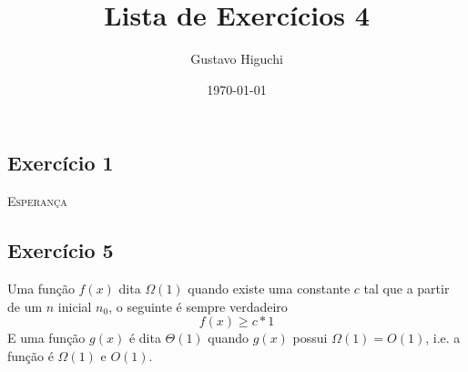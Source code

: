 \documentclass{article}
\title{Lista de Exercícios 4}
\author{Gustavo Higuchi}
\date{\today}
\begin{document}
\maketitle

\tableofcontents
\newpage


\chapter{}
\section{Exercício 1}
 \begin{algorithm}[H]
   \SetAlgoLined
   \label{alg1}
   \caption{\textsc{Esperança}}
 \end{algorithm}
\section{Exercício 5}
Uma função $f(x)$ dita $\Omega(1)$ quando existe uma constante $c$ tal que
a partir de um $n$ inicial $n_0$, o seguinte é sempre verdadeiro
\begin{equation}
    f(x) \geq c * 1 
\end{equation} 
E uma função $g(x)$ é dita $\Theta(1)$ quando $g(x)$ possui $\Omega(1) = O(1)$,
i.e. a função é $\Omega(1)$ e $O(1)$.
\end{document}
